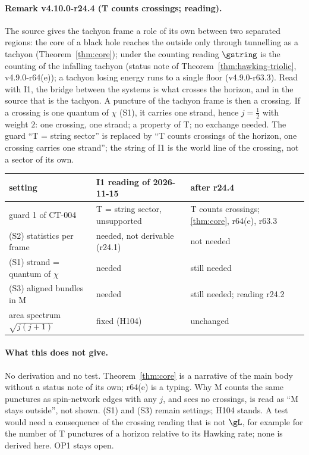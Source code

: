 \paragraph{Remark v4.10.0-r24.4 (T counts crossings; reading).}
The source gives the tachyon frame a role of its own between two separated regions: the core of a black hole reaches the outside only
through tunnelling as a tachyon (Theorem~\ref{thm:core}); under the counting reading \(\gstring\) is the counting of the infalling tachyon
(status note of Theorem~\ref{thm:hawking-triolic}, v4.9.0-r64(e)); a tachyon losing energy runs to a single floor (v4.9.0-r63.3).  Read
with I1, the bridge between the systems is what crosses the horizon, and in the source that is the tachyon.  A puncture of the tachyon
frame is then a crossing.  If a crossing is one quantum of \(\chi\) (S1), it carries one strand, hence \(j=\tfrac12\) with weight \(2\):
one crossing, one strand; a property of T; no exchange needed.  The guard ``T = string sector'' is replaced by ``T counts crossings of
the horizon, one crossing carries one strand''; the string of I1 is the world line of the crossing, not a sector of its own.
\begin{center}
\small
\begin{tabular}{@{}>{\raggedright\arraybackslash}p{}>{\raggedright\arraybackslash}p{}>{\raggedright\arraybackslash}p{}@{}}
\toprule
setting & I1 reading of 2026-11-15 & after r24.4\\
\midrule
guard 1 of CT-004 & T = string sector, unsupported & T counts crossings; \ref{thm:core}, r64(e), r63.3\\
(S2) statistics per frame & needed, not derivable (r24.1) & not needed\\
(S1) strand = quantum of \(\chi\) & needed & still needed\\
(S3) aligned bundles in M & needed & still needed; reading r24.2\\
area spectrum \(\sqrt{j(j+1)}\) & fixed (H104) & unchanged\\
\bottomrule
\end{tabular}
\end{center}

\paragraph{What this does not give.}
No derivation and no test.  Theorem~\ref{thm:core} is a narrative of the main body without a status note of its own; r64(e) is a typing.
Why M counts the same punctures as spin-network edges with any \(j\), and sees no crossings, is read as ``M stays outside'', not shown.
(S1) and (S3) remain settings; H104 stands.  A test would need a consequence of the crossing reading that is not \(\gL\), for example
for the number of T punctures of a horizon relative to its Hawking rate; none is derived here.  OP1 stays open.

